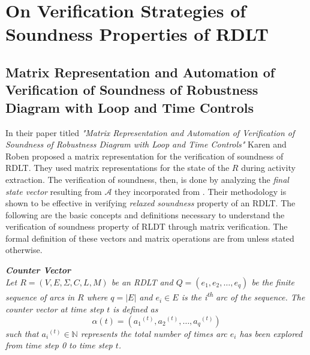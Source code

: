 
\section{On Verification Strategies of Soundness Properties of RDLT}
\subsection*{Matrix Representation and Automation of Verification of Soundness of Robustness Diagram with Loop and Time Controls}
In their paper titled \emph{"Matrix Representation and Automation of Verification of Soundness of Robustness Diagram with Loop and Time Controls"} Karen and Roben \cite{KarenRoben2018} proposed a matrix representation for the verification of soundness of RDLT. They used matrix representations for the state of the $R$ during activity extraction. The verification of soundness, then, is done by analyzing the \emph{final state vector} resulting from ${\mathcal{A}}$ they incorporated from \cite{Malinao2017}. Their methodology is shown to be effective in verifying \emph{relaxed soundness} property of an RDLT. 
The following are the basic concepts and definitions necessary to understand the verification of soundness property of RLDT through matrix verification. The formal definition of these vectors and matrix operations are from \cite{KarenRoben2018} unless stated otherwise.

\begin{defn}\label{def:counter_vector}
    \textit{\textbf{Counter Vector} \cite{KarenRoben2018}\\
    Let $R = (V, E, \Sigma, C, L, M)$ be an RDLT and $Q = (e_{1}, e_{2}, \ldots, e_{q})$ be the finite sequence of arcs in $R$ where $q = |E|$ and $e_{i} \in E$ is the i\textsuperscript{th} arc of the sequence. The counter vector at time step $t$ is defined as
    \begin{displaymath}
    \alpha(t) = ({a_{1}}^{(t)}, {a_{2}}^{(t)}, \ldots, {a_{q}}^{(t)})
    \end{displaymath}
    such that ${a_{i}}^{(t)} \in \mathbb{N}$ represents the total number of times arc $e_{i}$ has been explored from time step 0 to time step $t$.}
    \end{defn}
    
